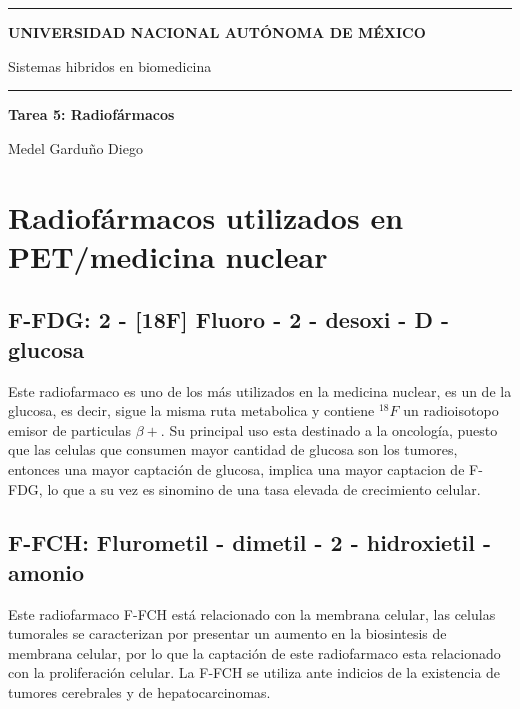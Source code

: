 \documentclass{article}
\begin{document}
\thispagestyle{plain}


\hrule
\begin{center}
    {\Large \textbf{UNIVERSIDAD NACIONAL AUTÓNOMA DE MÉXICO}}
    \vspace{10pt}

    {\Large{{Sistemas hibridos en biomedicina}}}
    
    
    \vspace{10pt}

    \hrule

    \vspace{20pt}


    {\Huge \textbf{Tarea 5: Radiofármacos}}\\
\end{center}

\hdashrule{\linewidth}{1pt}{1mm}

\begin{flushright}
    {\small Medel Garduño Diego} 
\end{flushright}

\section{Radiofármacos utilizados en PET/medicina nuclear}

\subsection{F-FDG: 2 - [18F] Fluoro - 2 - desoxi - D - glucosa }


Este radiofarmaco es uno de los más utilizados en la medicina nuclear, es un de la glucosa, es decir, sigue la misma ruta metabolica y contiene ${}^{18} F$ un radioisotopo emisor de particulas $\beta + $. Su principal uso esta destinado a la oncología, puesto que las celulas que consumen mayor cantidad de glucosa son los tumores, entonces una mayor captación de glucosa, implica una mayor captacion de F-FDG, lo que a su vez es sinomino de una tasa elevada de crecimiento celular. 


\subsection{F-FCH: Flurometil - dimetil - 2 - hidroxietil - amonio}

Este radiofarmaco F-FCH está relacionado con la membrana celular,  las celulas tumorales se caracterizan por presentar un aumento en la biosintesis de membrana celular, por lo que la captación de este radiofarmaco esta relacionado con la proliferación celular. La F-FCH se utiliza ante indicios de la existencia de tumores cerebrales y de hepatocarcinomas.
\end{document}
